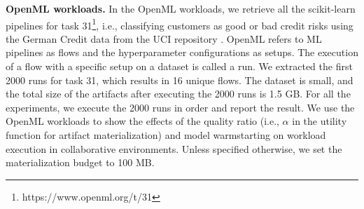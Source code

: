 \textbf{OpenML workloads.} In the OpenML workloads, we retrieve all the scikit-learn pipelines for task 31\footnote{https://www.openml.org/t/31}, i.e., classifying customers as good or bad credit risks using the German Credit data from the UCI repository \cite{asuncion2007uci}.
OpenML refers to ML pipelines as flows and the hyperparameter configurations as setups.
The execution of a flow with a specific setup on a dataset is called a run.
We extracted the first 2000 runs for task 31, which results in 16 unique flows. 
The dataset is small, and the total size of the artifacts after executing the 2000 runs is 1.5 GB.
For all the experiments, we execute the 2000 runs in order and report the result.
We use the OpenML workloads to show the effects of the quality ratio (i.e., $\alpha$ in the utility function for artifact materialization) and model warmstarting on workload execution in collaborative environments.
Unless specified otherwise, we set the materialization budget to 100 MB.

